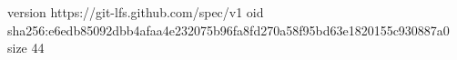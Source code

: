 version https://git-lfs.github.com/spec/v1
oid sha256:e6edb85092dbb4afaa4e232075b96fa8fd270a58f95bd63e1820155c930887a0
size 44
